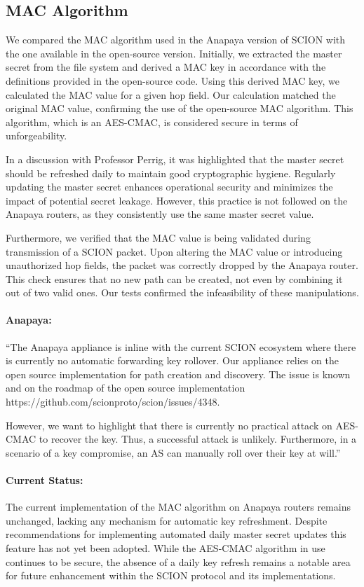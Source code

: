 \subsection{MAC Algorithm}
\label{sec:mac-algorithm}
We compared the MAC algorithm used in the Anapaya version of SCION with the one available in the open-source version.
Initially, we extracted the master secret from the file system and derived a MAC key in accordance with the definitions provided in the open-source code.
Using this derived MAC key, we calculated the MAC value for a given hop field.
Our calculation matched the original MAC value, confirming the use of the open-source MAC algorithm.
This algorithm, which is an AES-CMAC, is considered secure in terms of unforgeability.

In a discussion with Professor Perrig, it was highlighted that the master secret should be refreshed daily to maintain good cryptographic hygiene.
Regularly updating the master secret enhances operational security and minimizes the impact of potential secret leakage.
However, this practice is not followed on the Anapaya routers, as they consistently use the same master secret value.

Furthermore, we verified that the MAC value is being validated during transmission of a SCION packet.
Upon altering the MAC value or introducing unauthorized hop fields, the packet was correctly dropped by the Anapaya router.
This check ensures that no new path can be created, not even by combining it out of two valid ones.
Our tests confirmed the infeasibility of these manipulations.

\begin{boxH}
\paragraph{Anapaya:}
``The Anapaya appliance is inline with the current SCION ecosystem where there is currently no automatic forwarding key rollover. Our appliance relies on the open source implementation for path creation and discovery.
The issue is known and on the roadmap of the open source implementation https://github.com/scionproto/scion/issues/4348.

However, we want to highlight that there is currently no practical attack on AES-CMAC to recover the key.
Thus, a successful attack is unlikely. Furthermore, in a scenario of a key compromise, an AS can manually roll over their key at will.''
\end{boxH}

\paragraph{Current Status:}
The current implementation of the MAC algorithm on Anapaya routers remains unchanged, lacking any mechanism for automatic key refreshment.
Despite recommendations for implementing automated daily master secret updates this feature has not yet been adopted.
While the AES-CMAC algorithm in use continues to be secure, the absence of a daily key refresh remains a notable area for future enhancement within the SCION protocol and its implementations.

